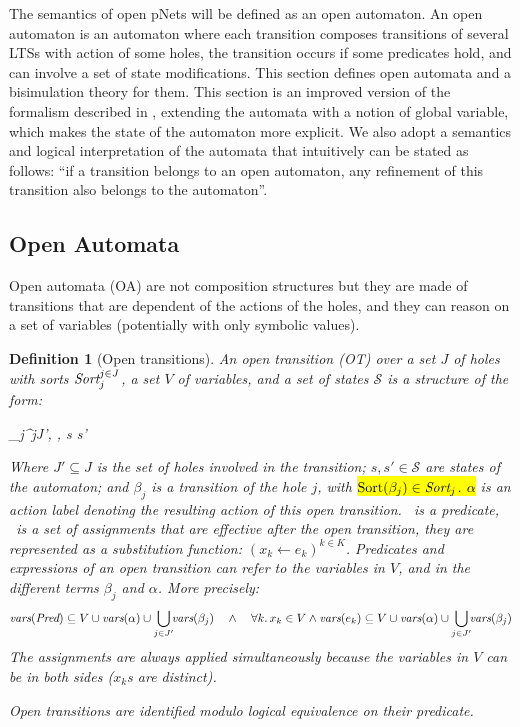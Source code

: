 \documentclass{lmcs}
\newcommand{\TODO}[1]{\textcolor{red}{\textbf{[TODO:#1]}}}
\newtheorem{definition}{Definition}
\begin{document}
The semantics of open pNets will be defined  as an open automaton. An open
automaton is an automaton where each transition composes transitions of several LTSs with
action of some holes, the transition occurs if some predicates hold, and can involve a 
set of state modifications. This section defines open automata and a bisimulation theory for them. This section is an improved version of the formalism described in \cite{henrio:Forte2016}, extending the automata with a notion of global variable, which makes the state of the automaton more explicit. We also adopt a semantics and logical interpretation of the automata that intuitively can be stated as follows: ``if a transition belongs to an open automaton, any refinement of this transition also belongs to the automaton''.

\subsection{Open Automata}
 Open automata (OA) are not composition structures but they are made of transitions that are dependent of the actions of the holes, and they can reason on a set of variables (potentially with only symbolic values). 
\begin{definition}[Open transitions]\label{def:OT}
	\label{def:OpenTransitions}
	An \emph{open transition} (OT) over a
	set $J$ of holes with sorts $\Sort_j^{j\in J}$, a set $V$ of variables, and a set of states $\mathcal{S}$ is 
	a structure of the form:	
	\begin{mathpar}
	\openrule
	{	\beta_j^{j\in J'}, \Pred, \Post}
	{s \OTarrow {\alpha}s'}
	\end{mathpar}
	Where $J'\subseteq J$ is the set of holes involved in the transition; $s, s'\in\mathcal{S}$ are states of the automaton; and $\beta_j$
        is a transition of the hole $j$, with \hl{$\Sortop(\beta_j)\in\Sort_j$. $\alpha$}  is an action 
        label denoting the resulting action of this open transition.
        \Pred\ is a predicate, \Post\ is a set of 
	assignments that are effective after the open transition, they are
        represented as a substitution function: $({x_k\gets e_k})^{k\in K}$.
Predicates and expressions of an open transition can refer to the variables in $V$, and
        in the different terms
        $\beta_j$ and $\alpha$. More precisely:
\[ \vars(\Pred) \subseteq V\cup\vars(\alpha)\cup
			{\displaystyle \bigcup_{j\in J'}\!\!\vars(\beta_j)}\quad\land\quad
\forall k.\, x_k\in V \land \vars(e_k)\subseteq V\cup\vars(\alpha)\cup
			{\displaystyle \bigcup_{j\in J'}\!\!\vars(\beta_j)}\]
The assignments are always applied simultaneously because the variables in $V$ can be in both sides ($x_k$s are distinct).

 Open transitions are identified
        modulo logical equivalence on their predicate. 
\end{definition}
\end{document}
